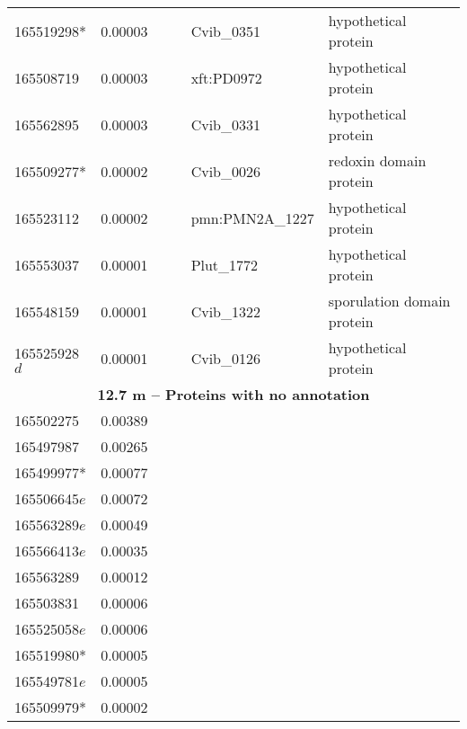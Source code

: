 \begin{landscape}
\begin{longtable}{p{1.8cm}p{0.9cm}p{2.2cm}p{1cm}p{2.8cm}p{13.4cm}}
165519298*&0.00003&&&Cvib\_0351&hypothetical protein \\
165508719&0.00003&&&xft:PD0972&hypothetical protein \\
165562895&0.00003&&&Cvib\_0331&hypothetical protein \\
165509277*&0.00002&&&Cvib\_0026&redoxin domain protein \\
165523112&0.00002&&&pmn:PMN2A\_1227&hypothetical protein \\
165553037&0.00001&&&Plut\_1772&hypothetical protein \\
165548159&0.00001&&&Cvib\_1322&sporulation domain protein \\
165525928$d$&0.00001&&&Cvib\_0126&hypothetical protein \\
\toprule
\multicolumn{6}{c}{\textbf{12.7 m -- Proteins with no annotation}} \\
\midrule
165502275&0.00389&&&& \\
165497987&0.00265&&&& \\
165499977*&0.00077&&&& \\
165506645$e$&0.00072&&&& \\
165563289$e$&0.00049&&&& \\
165566413$e$&0.00035&&&& \\
165563289&0.00012&&&& \\
165503831&0.00006&&&& \\
165525058$e$&0.00006&&&& \\
165519980*&0.00005&&&& \\
165549781$e$&0.00005&&&& \\
165509979*&0.00002&&&& \\
\end{longtable}
\endgroup
\end{landscape}
